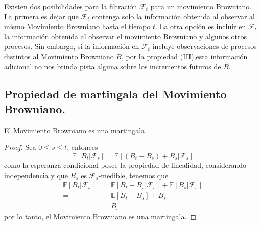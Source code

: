 \documentclass[11pt,notitlepage]{article}
\begin{document}
Existen dos posibilidades para la filtración $\mathcal{F}_t$ para un movimiento Browniano. La primera es dejar que $\mathcal{F}_t$ contenga solo la información obtenida al observar al mismo
Movimiento Browniano hasta el tiempo \(t\). La otra opción es incluir en $\mathcal{F}_t$ la información
obtenida al observar el movimiento Browniano y algunos otros procesos. Sin embargo, si la información en $\mathcal{F}_t$ incluye observaciones  de procesos distintos al Movimiento Browniano $B$, por la propiedad (III),esta información adicional no nos brinda pista alguna sobre los incrementos futuros de $B$.

\subsection{Propiedad de martingala del Movimiento Browniano.}
\begin{teor} \label{Secc1.11_Teorema1}
El Movimiento Browniano es una martingala
\end{teor}
\begin{proof}
Sea \(0 \leq s \leq t\), entonces
\begin{equation*}
    \mathbb{E} \left[ B_t| \mathcal{F}_s \right] = \mathbb{E}\left[ (B_t-B_s)+ B_s|\mathcal{F}_s \right]
\end{equation*}
como la esperanza condicional posee la propiedad de linealidad, considerando independencia y que \(B_s\) es \(\mathcal{F}_s\)-medible, tenemos que 
\begin{align*}
    \mathbb{E} \left[ B_t| \mathcal{F}_s \right]=&\mathbb{E} \left[ B_t- B_s|\mathcal{F}_s \right] + \mathbb{E} \left[B_s|\mathcal{F}_s \right] \\
    =& \mathbb{E}[ B_t- B_s] + B_s\\
    =& B_s
\end{align*}
por lo tanto, el Movimiento Browniano es una martingala.
\end{proof}
\end{document}
